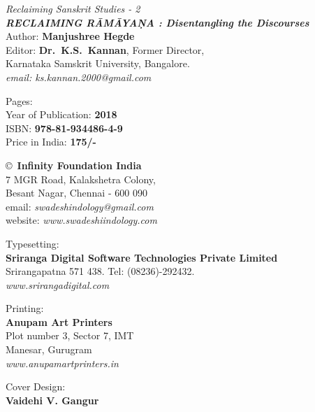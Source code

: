 \thispagestyle{empty}
\noindent
{\fontsize{9}{11}\selectfont\sl Reclaiming Sanskrit Studies - 2}\\
{\sl\bfseries RECLAIMING RĀMĀYAṆA : Disentangling the Discourses}\\[1pt] 
Author: {\bf Manjushree Hegde}\\[9pt]
Editor: {\bf Dr.\ K.S.\ Kannan}, Former Director,\\ 
Karnataka Samskrit University, Bangalore.\\
{\sl email: ks.kannan.2000@gmail.com}
\vfill

\noindent
Pages: {\bf \pageref{book:end}}\\
Year of Publication: {\bf 2018}\\
ISBN: {\bf 978-81-934486-4-9}\\
Price in India: {\bf 175/-}
\vfill

\noindent
\copyright\ {\bf Infinity Foundation India}\\ 
7 MGR Road, Kalakshetra Colony,\\ 
Besant Nagar, Chennai - 600 090\\
email: {\sl swadeshindology@gmail.com}\\
website: {\sl www.swadeshiindology.com} 
\vfill

\noindent
Typesetting:\\
{\bf Sriranga Digital Software Technologies Private Limited}\\ 
Srirangapatna 571 438. Tel: (08236)-292432.\\
{\sl www.srirangadigital.com}\\

\vfill

\noindent
Printing:\\
{\bf Anupam Art Printers}\\
Plot number 3, Sector 7, IMT\\
Manesar, Gurugram\\
{\sl www.anupamartprinters.in}

\vfill
\noindent
Cover Design:\\
{\bf Vaidehi V. Gangur}
